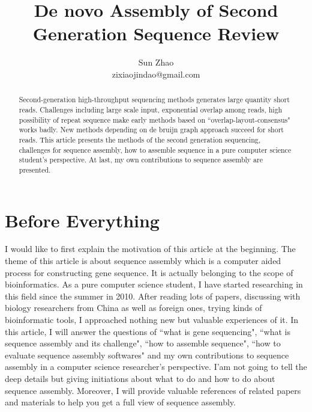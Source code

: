 \documentclass{article}
\title{De novo Assembly of Second Generation Sequence Review}
\author{Sun Zhao\\zixiaojindao@gmail.com}
\begin{document}
\maketitle
\newpage

\begin{abstract}
Second-generation high-throughput sequencing methods generates large quantity short reads. Challenges including large scale input, exponential overlap among reads, high possibility of repeat sequence make early methods based on ``overlap-layout-consensus" works badly. New methods depending on de bruijn graph approach succeed for short reads. This article presents the methods of the second generation sequencing, challenges for sequence assembly, how to assemble sequence in a pure computer science student's perspective. At last, my own contributions to sequence assembly are presented.
\end{abstract}

\section{Before Everything}
I would like to first explain the motivation of this article at the beginning. The theme of this article is about sequence assembly which is a computer aided process for constructing gene sequence. It is actually belonging to the scope of bioinformatics. As a pure computer science student, I have started researching in this field since the summer in 2010. After reading lots of papers, discussing with biology researchers from China as well as foreign ones, trying kinds of bioinformatic tools, I approached nothing new but valuable experiences of it. In this article, I will answer the questions of ``what is gene sequencing", ``what is sequence assembly and its challenge", ``how to assemble sequence", ``how to evaluate sequence assembly softwares" and my own contributions to sequence assembly in a computer science researcher's perspective. I'am not going to tell the deep details but giving initiations about what to do and how to do about sequence assembly. Moreover, I will provide valuable references of related papers and materials to help you get a full view of sequence assembly.
\end{document}
